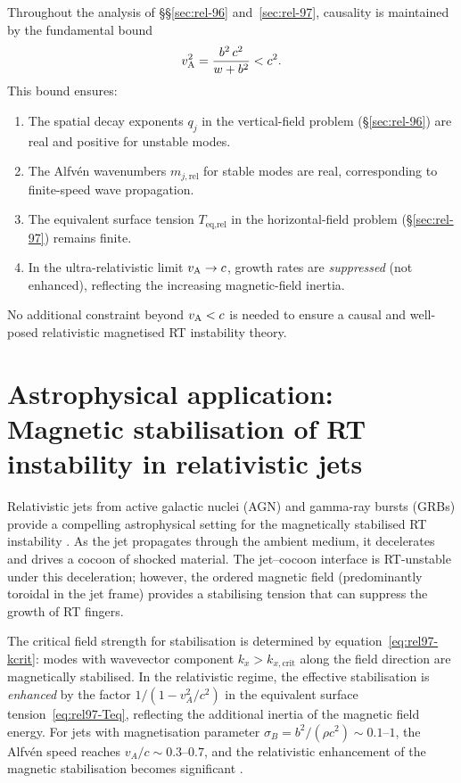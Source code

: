 Throughout the analysis of \S\S\ref{sec:rel-96} and~\ref{sec:rel-97},
causality is maintained by the fundamental bound
\begin{equation}
  v_{\mathrm{A}}^{2}
    = \frac{b^{2}\,c^{2}}{w + b^{2}}
    < c^{2}.
  \label{eq:rel96-97-causality}
\end{equation}
This bound ensures:
\begin{enumerate}
  \item The spatial decay exponents $q_{j}$ in the vertical-field
    problem (\S\ref{sec:rel-96}) are real and positive for unstable modes.
  \item The Alfv\'en wavenumbers $m_{j,\text{rel}}$ for stable modes
    are real, corresponding to finite-speed wave propagation.
  \item The equivalent surface tension $T_{\text{eq,rel}}$ in the
    horizontal-field problem (\S\ref{sec:rel-97}) remains finite.
  \item In the ultra-relativistic limit $v_{\mathrm{A}}\to c$, growth rates are
    \emph{suppressed} (not enhanced), reflecting the increasing
    magnetic-field inertia.
\end{enumerate}
No additional constraint beyond $v_{\mathrm{A}}<c$ is needed to ensure a causal
and well-posed relativistic magnetised RT instability theory.

\section{Astrophysical application: Magnetic stabilisation of RT
instability in relativistic jets}\label{sec:rel-96-97-astro}

Relativistic jets from active galactic nuclei (AGN) and gamma-ray
bursts (GRBs) provide a compelling astrophysical setting for the
magnetically stabilised RT instability \citep{Matsumoto2013RT,Mignone2010}.
As the jet propagates through the ambient medium, it decelerates and
drives a cocoon of shocked material.  The jet--cocoon interface is
RT-unstable under this deceleration; however, the ordered magnetic
field (predominantly toroidal in the jet frame) provides a stabilising
tension that can suppress the growth of RT fingers.

The critical field strength for stabilisation is determined by
equation~\eqref{eq:rel97-kcrit}: modes with wavevector component
$k_{x} > k_{x,\mathrm{crit}}$ along the field direction are
magnetically stabilised.  In the relativistic regime, the effective
stabilisation is \emph{enhanced} by the factor $1/(1-v_{A}^{2}/c^{2})$
in the equivalent surface tension~\eqref{eq:rel97-Teq}, reflecting
the additional inertia of the magnetic field energy.  For jets with
magnetisation parameter $\sigma_{B} = b^{2}/(\rho c^{2}) \sim 0.1$--$1$,
the Alfv\'en speed reaches $v_{A}/c \sim 0.3$--$0.7$, and the
relativistic enhancement of the magnetic stabilisation becomes
significant \citep{Bromberg2019,GourgouliatosKomissarov2018}.

